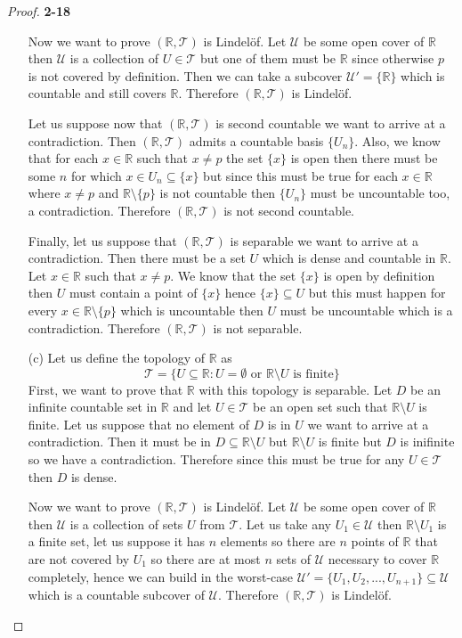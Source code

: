 \documentclass[11pt]{article}
\newcommand{\R}{\mathbb{R}}
\newcommand{\Topo}{\mathcal{T}}
\newcommand{\setmin}{\setminus}
\theoremstyle{definition}
\begin{document}
\begin{proof}{\textbf{2-18}}
\begin{itemize}
    Now we want to prove $(\R, \mathcal{T})$ is Lindelöf.
    Let $\mathcal{U}$ be some open cover of $\R$ then $\mathcal{U}$ is 
    a collection of $U \in \Topo$ but one of them must be $\R$ since otherwise
    $p$ is not covered by definition. 
    Then we can take a subcover $\mathcal{U}' = \{\R\}$ which is countable and
    still covers $\R$. Therefore $(\R, \mathcal{T})$ is Lindelöf.
    
    Let us suppose now that $(\R, \mathcal{T})$ is second countable we want to
    arrive at a contradiction. Then $(\R, \mathcal{T})$ admits a countable
    basis $\{U_n\}$. Also, we know that for each $x \in \R$ such that
    $x \neq p$ the set $\{x\}$ is open then there must be some $n$ for which
    $x \in U_n \subseteq \{x\}$ but since this must be true for each
    $x \in \R$ where $x \neq p$ and $\R \setmin \{p\}$ is not countable then
    $\{U_n\}$ must be uncountable too, a contradiction.
    Therefore $(\R, \mathcal{T})$ is not second countable.

    Finally, let us suppose that $(\R, \mathcal{T})$ is separable we want to
    arrive at a contradiction. Then there must be a set $U$ which is dense
    and countable in $\R$. Let $x \in \R$ such that $x \neq p$. We know that
    the set $\{x\}$ is open by definition then $U$ must contain a point of
    $\{x\}$ hence $\{x\} \subseteq U$ but this
    must happen for every $x \in \R \setmin \{p\}$ which is uncountable then
    $U$ must be uncountable which is a contradiction.
    Therefore $(\R, \mathcal{T})$ is not separable.

    \cleardoublepage
    \item [(c)] Let us define the topology of $\R$ as
    $$\mathcal{T}=
    \{U \subseteq \R: U= \emptyset \text{ or }
    \R \setmin U \text{ is finite}\}$$
    First, we want to prove that $\R$ with this topology is separable.
    Let $D$ be an infinite countable set in $\R$ and let $U \in \Topo$ be an
    open set such that $\R \setmin U$ is finite.
    Let us suppose that no element of $D$ is in $U$ we want to arrive at a
    contradiction. Then it must be in $D \subseteq  \R \setmin U$ but
    $\R \setmin U$ is finite but $D$ is inifinite so we have a contradiction.
    Therefore since this must be true for any $U \in \Topo$ then $D$ is dense.
    
    Now we want to prove $(\R, \mathcal{T})$ is Lindelöf.
    Let $\mathcal{U}$ be some open cover of $\R$ then $\mathcal{U}$ is 
    a collection of sets $U$ from $\Topo$. Let us take any $U_1 \in \mathcal{U}$
    then $\R \setmin U_1$ is a finite set, let us suppose it has $n$ elements
    so there are $n$ points of $\R$ that are not covered by $U_1$ so there are
    at most $n$ sets of $\mathcal{U}$ necessary to cover $\R$ completely,
    hence we can build in the worst-case
    $\mathcal{U}' = \{U_1, U_2,...,U_{n+1}\} \subseteq \mathcal{U}$
    which is a countable subcover of $\mathcal{U}$.
    Therefore $(\R, \mathcal{T})$ is Lindelöf.


\end{itemize}
\end{proof}
\end{document}

